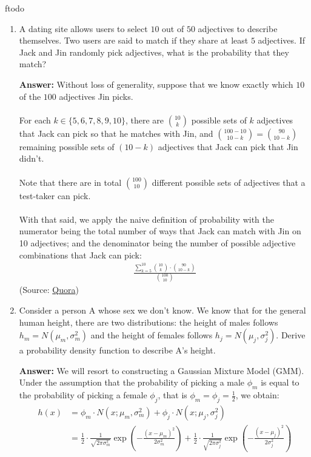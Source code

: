 ƒtodo\documentclass{article}
\newenvironment{QandA}{\begin{enumerate}[label=\arabic*.]}{\end{enumerate}}
\newenvironment{answer}{\par\normalfont \textbf{Answer:}}{}
\begin{document}
\begin{QandA}
    \item A dating site allows users to select $10$ out of $50$ adjectives to describe themselves. Two users are said to match if they share at least $5$ adjectives. If Jack and Jin randomly pick adjectives, what is the probability that they match?
    \begin{answer}
        Without loss of generality, suppose that we know exactly which $10$ of the $100$ adjectives Jin picks.\\\\
        For each $k \in \{5, 6, 7, 8, 9, 10\}$, there are ${10 \choose k}$  possible sets of $k$ adjectives that Jack can pick so that he matches with Jin, and ${100-10 \choose 10-k} = {90 \choose 10-k}$ remaining possible sets of $(10-k)$ adjectives that Jack can pick that Jin didn't. \\\\
        Note that there are in total ${100 \choose 10}$ different possible sets of adjectives that a test-taker can pick. \\\\
        With that said, we apply the naive definition of probability with the numerator being the total number of ways that Jack can match with Jin on 10 adjectives; and the denominator being the number of possible adjective combinations that Jack can pick:
        \begin{align*}
            \frac{\sum_{k=5}^{10} {10 \choose k} \cdot {90 \choose 10-k}}{{100 \choose 10}}
        \end{align*}
        (Source: \href{https://www.quora.com/On-a-dating-site-users-can-select-5-out-of-24-adjectives-to-describe-themselves-A-match-is-declared-between-two-users-if-they-match-on-at-least-4-adjectives-If-Alice-and-Bob-randomly-pick-adjectives-what-is-the-probability-that-they-will-form-a-match/answer/William-Chen-6?ch=10&oid=8079414&share=54d36e1b&srid=RbHjN&target_type=answer}{Quora})
    \end{answer}

    \item Consider a person A whose sex we don’t know. We know that for the general human height, there are two distributions: the height of males follows $h_m = N(\mu_m, \sigma_m^2)$ and the height of females follows  $h_j=N(\mu_j, \sigma_j^2)$. Derive a probability density function to describe A’s height.
    \begin{answer}
        We will resort to constructing a Gaussian Mixture Model (GMM). Under the assumption that the probability of picking a male $\phi_m$ is equal to the probability of picking a female $\phi_j$, that is $\phi_m=\phi_j=\frac{1}{2}$, we obtain:
        \begin{align*}
            h(x) &= \phi_m \cdot N(x; \mu_m, \sigma_m^2) + \phi_j \cdot N(x; \mu_j, \sigma_j^2) \\ 
            &= \frac{1}{2}\cdot \frac{1}{\sqrt{2\pi\sigma_m^2}}\exp\left(-\frac{(x-\mu_m)^2}{2\sigma_m^2} \right) + \frac{1}{2}\cdot \frac{1}{\sqrt{2\pi\sigma_j^2}}\exp\left(-\frac{(x-\mu_j)^2}{2\sigma_j^2} \right)
        \end{align*}
    \end{answer}


\end{QandA}
\end{document}

